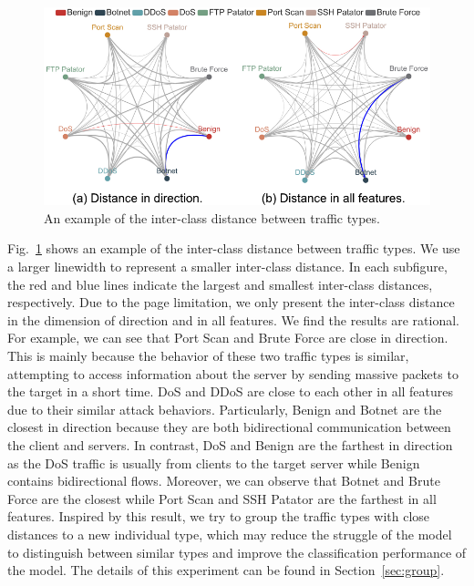 \begin{figure}[htbp]
	\centering
	\includegraphics[scale=0.6]{figs/inter_class_distance.pdf}
	\caption{An example of the inter-class distance between traffic types.}
	\label{fig:traffic_distance}
\end{figure}

Fig.~\ref{fig:traffic_distance} shows an example of the inter-class distance between traffic types. 
We use a larger linewidth to represent a smaller inter-class distance. 
In each subfigure, the red and blue lines indicate the largest and smallest inter-class distances, respectively. 
Due to the page limitation, we only present the inter-class distance in the dimension of direction and in all features.
We find the results are rational.
For example, we can see that Port Scan and Brute Force are close in direction. 
This is mainly because the behavior of these two traffic types is similar, \ie attempting to access information about the server by sending massive packets to the target in a short time.
DoS and DDoS are close to each other in all features due to their similar attack behaviors.
Particularly, Benign and Botnet are the closest in direction because they are both bidirectional communication between the client and servers. 
In contrast, DoS and Benign are the farthest in direction as the DoS traffic is usually from clients to the target server while Benign contains bidirectional flows. 
Moreover, we can observe that Botnet and Brute Force are the closest while Port Scan and SSH Patator are the farthest in all features. 
Inspired by this result, we try to group the traffic types with close distances to a new individual type, which may reduce the struggle of the model to distinguish between similar types and improve the classification performance of the model. 
The details of this experiment can be found in Section~\ref{sec:group}.
